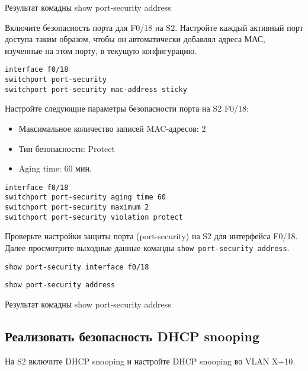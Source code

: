 \begin{image}
	\caption{Результат комадны show port-security address}
\end{image}

Включите безопасность порта для F0/18 на S2.
Настройте каждый активный порт доступа таким образом,
чтобы он автоматически добавлял адреса МАС, изученные на этом порту,
в текущую конфигурацию.

\begin{verbatim}
interface f0/18
switchport port-security
switchport port-security mac-address sticky
\end{verbatim}

Настройте следующие параметры безопасности порта на S2 F0/18:

\begin{itemize}
	\item Максимальное количество записей MAC-адресов: 2
	\item Тип безопасности: Protect
	\item Aging time: 60 мин.
\end{itemize}

\begin{verbatim}
interface f0/18
switchport port-security aging time 60
switchport port-security maximum 2
switchport port-security violation protect
\end{verbatim}

Проверьте настройки защиты порта (port-security)
на S2 для интерфейса F0/18. Далее просмотрите выходные
данные команды \texttt{show port-security address}.

\begin{verbatim}
show port-security interface f0/18
\end{verbatim}

\begin{verbatim}
show port-security address
\end{verbatim}

\begin{image}
	\caption{Результат комадны show port-security address}
\end{image}

\subsection{Реализовать безопасность DHCP snooping}

На S2 включите DHCP snooping и настройте DHCP snooping во VLAN X+10.

